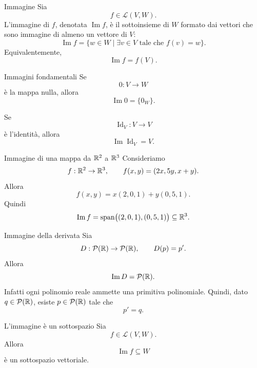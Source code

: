 \documentclass[a4paper]{article}
\begin{document}
\begin{snippetdefinition}{Immagine}
    Sia
    \[
        f\in\mathcal{L}(V,W).
    \]
    L'immagine di \(f\), denotata \(\operatorname{Im} f\), è il sottoinsieme di \(W\) formato dai vettori che sono immagine di almeno un vettore di \(V\):
    \[
        \operatorname{Im} f
        =
        \{w\in W\mid \exists v\in V \text{ tale che } f(v)=w\}.
    \]
    Equivalentemente,
    \[
        \operatorname{Im} f
        =
        f(V).
    \]
\end{snippetdefinition}

\begin{snippetexample}{Immagini fondamentali}
    Se
    \[
        0:V\to W
    \]
    è la mappa nulla, allora
    \[
        \operatorname{Im}0=\{0_W\}.
    \]

    Se
    \[
        \operatorname{Id}_V:V\to V
    \]
    è l'identità, allora
    \[
        \operatorname{Im}\operatorname{Id}_V=V.
    \]
\end{snippetexample}

\begin{snippetexample}{Immagine di una mappa da \(\mathbb{R}^2\) a \(\mathbb{R}^3\)}
    Consideriamo
    \[
        f:\mathbb{R}^2\to\mathbb{R}^3,
        \qquad
        f(x,y)=(2x,5y,x+y).
    \]
    Allora
    \[
        f(x,y)
        =
        x(2,0,1)+y(0,5,1).
    \]
    Quindi
    \[
        \operatorname{Im}f
        =
        \operatorname{span}\bigl((2,0,1),(0,5,1)\bigr)
        \subseteq \mathbb{R}^3.
    \]
\end{snippetexample}

\begin{snippetexample}{Immagine della derivata}
    Sia
    \[
        D:\mathcal{P}(\mathbb{R})\to\mathcal{P}(\mathbb{R}),
        \qquad
        D(p)=p'.
    \]
    Allora
    \[
        \operatorname{Im}D=\mathcal{P}(\mathbb{R}).
    \]
    Infatti ogni polinomio reale ammette una primitiva polinomiale. Quindi, dato \(q\in\mathcal{P}(\mathbb{R})\), esiste \(p\in\mathcal{P}(\mathbb{R})\) tale che
    \[
        p'=q.
    \]
\end{snippetexample}

\begin{snippetproposition}{L'immagine è un sottospazio}
    Sia
    \[
        f\in\mathcal{L}(V,W).
    \]
    Allora
    \[
        \operatorname{Im}f\subseteq W
    \]
    è un sottospazio vettoriale.
\end{snippetproposition}
\end{document}
